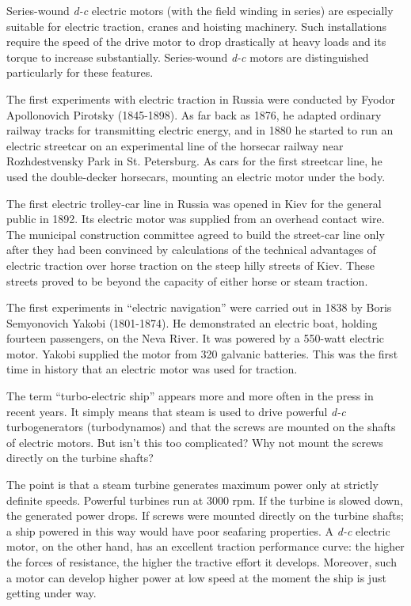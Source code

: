 Series-wound \emph{d-c} electric motors (with the field winding in series) are especially suitable for electric traction, cranes and hoisting machinery. Such installations require the speed of the drive motor to drop drastically at heavy loads and its torque to increase substantially. Series-wound \emph{d-c} motors are distinguished particularly for these features.

The first experiments with electric traction in Russia were conducted by Fyodor Apollonovich Pirotsky (1845-1898). As far back as 1876, he adapted ordinary railway tracks for transmitting electric energy, and in 1880 he started to run an electric streetcar on an experimental line of the horsecar railway near Rozhdestvensky Park in St. Petersburg. As cars for the first streetcar line, he used the double-decker horsecars, mounting an electric motor under the body.

The first electric trolley-car line in Russia was opened in Kiev for the general public in 1892. Its electric motor was supplied from an overhead contact wire. The municipal construction committee agreed to build the street-car line only after they had been convinced by calculations of the technical advantages of electric traction over horse traction on the steep hilly streets of Kiev. These streets proved to be beyond the capacity of either horse or steam traction.

The first experiments in ``electric navigation'' were carried out in 1838 by Boris Semyonovich Yakobi (1801-1874). He demonstrated an electric boat, holding fourteen passengers, on the Neva River. It was powered by a 550-watt electric motor. Yakobi supplied the motor from 320 galvanic batteries. This was the first time in history that an electric motor was used for traction.

The term ``turbo-electric ship'' appears more and more often in the press in recent years. It simply means that steam is used to drive powerful \emph{d-c} turbogenerators (turbodynamos) and that the screws are mounted on the shafts of electric motors. But isn't this too complicated? Why not mount the screws directly on the turbine shafts?

The point is that a steam turbine generates maximum power only at strictly definite speeds. Powerful turbines run at 3000 rpm. If the turbine is slowed down, the generated power drops. If screws were mounted directly on the turbine shafts; a ship powered in this way would have poor seafaring properties. A \emph{d-c} electric motor, on the other hand, has an excellent traction performance curve: the higher the forces of resistance, the higher the tractive effort it develops. Moreover, such a motor can develop higher power at low speed at the moment the ship is just getting under way.


